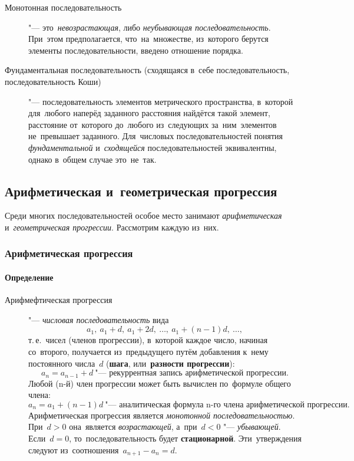 \documentclass[]{scrartcl}
\begin{document}
\begin{description}
	\item[Монотонная последовательность] "--- это~\emph{невозрастающая}, либо \emph{неубывающая последовательность}. При~этом предполагается, что~на~множестве, из~которого берутся элементы последовательности, введено отношение порядка.
	\item[Фундаментальная последовательность (сходящаяся в~себе последовательность,
	последовательность Коши)] "--- последовательность элементов метрического пространства, в~которой для~любого наперёд заданного расстояния найдётся такой элемент, расстояние от~которого до~любого из~следующих за~ним~элементов не~превышает заданного. Для~числовых последовательностей понятия \emph{фундаментальной} и~\emph{сходящейся} последовательностей эквивалентны, однако в~общем случае это~не~так.
\end{description}

\subsection{Арифметическая и~геометрическая прогрессия}
Среди многих последовательностей особое место занимают \emph{арифметическая} и~\emph{геометрическая прогрессии}. Рассмотрим каждую из~них.
\subsubsection{Арифметическая прогрессия}
\paragraph{Определение}
\begin{description}
	\item[Арифмефтическая прогрессия] "--- \emph{числовая последовательность} вида
	\begin{equation}\label{eq:arithmetic-progression-1}
	a_1,\ a_1+d,\ a_1+2d,\ \ldots,\ a_1+(n-1)d, \ \ldots,
	\end{equation}
	т.\,е.~чисел (членов прогрессии), в~которой каждое число, начиная со~второго, получается из~предыдущего путём добавления к~нему постоянного числа~${\textstyle d}$ (\textbf{шага}, или~\textbf{разности прогрессии}):
	\begin{equation}\label{eq:arithmetic-progression-2}
	a_{n}=a_{n-1}+d\ \text{"--- рекуррентная запись арифметической прогрессии.}
	\end{equation} 
	Любой (n-й) член прогрессии может быть вычислен по~формуле общего члена:
	\begin{equation}\label{eq:arithmetic-progression-3}
	a_n=a_1 + (n-1)d\ \text{"--- аналитическая формула n-го члена арифметической прогрессии.}
	\end{equation}
	Арифметическая прогрессия является \emph{монотонной последовательностью}. При~${\textstyle d>0}$ она~является \emph{возрастающей}, а~при~${\textstyle d<0}$ "--- \emph{убывающей}. Если~${\textstyle d=0}$, то~последовательность будет \textbf{стационарной}. Эти~утверждения следуют из~соотношения~${\textstyle a_{n+1}-a_{n}=d}$. 
\end{description}
\end{document}

